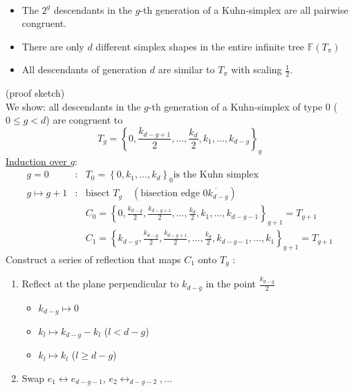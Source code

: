 \begin{theorem}\
	\begin{itemize}
		\item The $2^g$ descendants in the $g$-th generation of a Kuhn-simplex are all pairwise congruent.
		\item There are only $d$ different simplex shapes in the entire infinite tree $\mathbb{F}(T_{\pi})$
		\item All descendants of generation $d$ are similar to $T_{\pi}$ with scaling $\frac{1}{2}$.
			
	\end{itemize}
\end{theorem}
\begin{proof_}
	(proof sketch)\\
	We show: all descendants in the $g$-th generation of a Kuhn-simplex of type $0$ ($0 \leq g < d$) are congruent to
	\begin{equation*}
		T_{g}= \left\{0, \frac{k_{d-g+1}}{2},\dots ,\frac{k_{d}}{2},k_{1},\dots ,k_{d-g} \right\}_{g}
	\end{equation*}
	\underline{Induction over $g$}:
	\begin{align*}
		g=0&: & T_{0}= \left\{0,k_{1},\dots ,k_{d} \right\}_{0} \text{is the Kuhn simplex}\\
		g\mapsto g+1&: &\text{bisect } T_{g}\quad ( \text{bisection edge } \overline{0k_{d-g}})\\
		 && C_{0}= \left\{ 0, \frac{k_{d-g}}{2},\frac{k_{d-g+1}}{2},\dots , \frac{k_{d}}{2},k_{1},\dots ,k_{d-g-1} \right\}_{g+1}= T_{g+1}\\
		 && C_{1}= \left\{ k_{d-g}, \frac{k_{d-g}}{2},\frac{k_{d-g+1}}{2},\dots , \frac{k_{d}}{2},k_{d-g-1},\dots ,k_{1} \right\}_{g+1}= T_{g+1}
	\end{align*}
	Construct a series of reflection that maps $C_{1}$ onto $T_{g}$ :
	\begin{enumerate}
		\item Reflect at the plane perpendicular to $k_{d-g}$ in the point $\frac{k_{d-g}}{2}$
			\begin{itemize}
				\item $k_{d-g} \mapsto 0$
				\item $k_{l} \mapsto k_{d-g}-k_{l}$ ($l < d-g$)
				\item $k_{l} \mapsto k_{l}$ ($l \geq d-g$)
			\end{itemize}
		\item Swap $e_{1}\leftrightarrow e_{d-g-1}$, $e_{2} \leftrightarrow_{d-g-2},\dots $
			\begin{itemize}

\end{itemize}
\end{enumerate}
\end{proof_}
